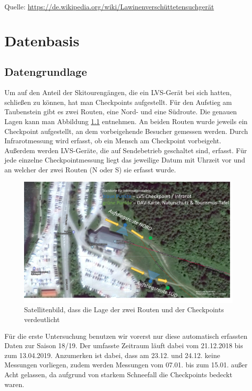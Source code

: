 \documentclass[11pt,a4paper]{report}
\begin{document}
Quelle:
\url{https://de.wikipedia.org/wiki/Lawinenverschüttetensuchgerät}

\chapter{Datenbasis}

\section{Datengrundlage}

Um auf den Anteil der Skitourengängen, die ein LVS-Gerät bei sich hatten, schließen zu können, hat man Checkpoints aufgestellt. Für den Aufstieg am Taubenstein gibt es zwei Routen, eine Nord- und eine Südroute. Die genauen Lagen kann man Abbildung \ref{pic:checkpoints} entnehmen. An beiden Routen wurde jeweils ein Checkpoint aufgestellt, an dem vorbeigehende Besucher gemessen werden. Durch Infrarotmessung wird erfasst, ob ein Mensch am Checkpoint vorbeigeht. Außerdem werden LVS-Geräte, die auf Sendebetrieb geschaltet sind, erfasst. Für jede einzelne Checkpointmessung liegt das jeweilige Datum mit Uhrzeit vor und an welcher der zwei Routen (N oder S) sie erfasst wurde.

\begin{figure}[h]
\centering
\includegraphics[scale=0.5]{Bilder/Checkpoints}
\caption[Checkpoints]{Satellitenbild, dass die Lage der zwei Routen und der Checkpoints verdeutlicht}
\label{pic:checkpoints}
\end{figure}

Für die erste Untersuchung benutzen wir vorerst nur diese automatisch erfassten Daten zur Saison 18/19. Der umfasste Zeitraum läuft dabei vom 21.12.2018 bis zum 13.04.2019. Anzumerken ist dabei, dass am 23.12. und 24.12. keine Messungen vorliegen, zudem werden Messungen vom 07.01. bis zum 15.01. außer Acht gelassen, da aufgrund von starkem Schneefall die Checkpoints bedeckt waren.
\end{document}
